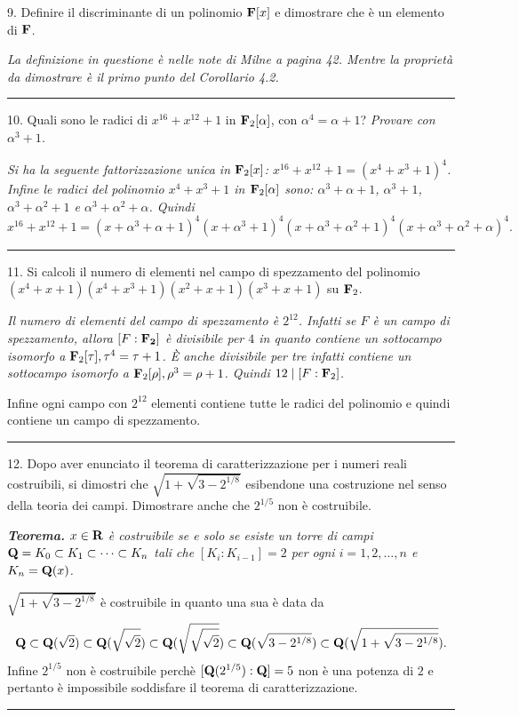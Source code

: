 \item{9.} Definire il discriminante di un polinomio ${\bf F}[x]$ e
dimostrare che \`{e} un elemento di ${\bf F}$.
\medskip

{\it La definizione in questione \`{e} nelle note di Milne a
pagina 42. Mentre la propriet\`{a} da dimostrare \`{e} il primo
punto del Corollario 4.2.}
\medskip\hrule
\medskip

\item{10.} Quali sono le radici di $x^{16}+x^{12}+1$ in ${\bf
F}_2[\alpha]$, con $\alpha^4=\alpha+1$?
\hfill {\it Provare con $\alpha^3+1$.}\medskip

{\it Si ha la seguente fattorizzazione unica in ${\bf F}_2[x]$:
$x^{16}+x^{12}+1=(x^4+x^3+1)^4$. Infine le radici del polinomio
$x^4+x^3+1$ in ${\bf F}_2[\alpha]$ sono: $\alpha^3+\alpha+1$,
$\alpha^3+1$, $\alpha^3+\alpha^2+1$ e $\alpha^3+\alpha^2+\alpha$. Quindi
$$x^{16}+x^{12}+1=(x+\alpha^3+\alpha+1)^4(x+\alpha^3+1)^4(x+\alpha^3+\alpha^2+1)^4
(x+\alpha^3+\alpha^2+\alpha)^4.$$}
\medskip\hrule
\medskip



\item{11.} Si calcoli il numero di elementi nel campo di
spezzamento del polinomio $(x^4+x+1)(x^4+x^3+1)(x^2+x+1)(x^3+x+1)$
su ${\bf F}_2$.\medskip

{\it Il numero di elementi del campo di spezzamento \`{e}
$2^{12}$. Infatti se $F$ \`{e} un campo di spezzamento, allora
$[F:{\bf F_2}]$ \`{e} divisibile per $4$ in quanto contiene un
sottocampo isomorfo a ${\bf F}_2[\tau], \tau^4=\tau+1$. \`{E}
anche divisibile per tre infatti contiene un sottocampo isomorfo a
${\bf F}_2[\rho], \rho^3=\rho+1$. Quindi $12\mid [F:{\bf F}_2]$.

Infine ogni campo con $2^{12}$ elementi contiene tutte le radici
del polinomio e quindi contiene un campo di
spezzamento.}\medskip\hrule
\medskip


\item{12.} Dopo aver enunciato il teorema di caratterizzazione per
i numeri reali costruibili, si dimostri che
$\sqrt{1+\sqrt{3-2^{1/8}}}$ esibendone una costruzione nel senso
della teoria dei campi. Dimostrare anche che $2^{1/5}$ non \`{e}
costruibile.\medskip

{\it {\bf Teorema.} $x\in {\bf R}$ \`{e} costruibile se e solo se
esiste un torre di campi ${\bf Q}=K_0\subset
K_1\subset\cdots\subset K_n$ tali che $[K_i:K_{i-1}]=2$ per ogni
$i=1,2,\ldots,n$ e $K_n={\bf Q}(x)$.\smallskip

$\sqrt{1+\sqrt{3-2^{1/8}}}$ \`{e} costruibile in quanto una sua
\`{e} data da
$${\bf Q}\subset{\bf Q}(\sqrt{2})\subset{\bf Q}(\sqrt{\sqrt{2}})
\subset{\bf Q}(\sqrt{\sqrt{\sqrt{2}}})\subset{\bf Q}(\sqrt{3-2^{1/8}})
\subset{\bf Q}(\sqrt{1+\sqrt{3-2^{1/8}}}).$$ Infine $2^{1/5}$ non \`{e}
costruibile perch\`{e} $[{\bf Q}(2^{1/5}):{\bf Q}]=5$ non \`{e} una potenza
di $2$ e pertanto \`{e} impossibile soddisfare il teorema di
caratterizzazione.\medskip\hrule}



 \bye
